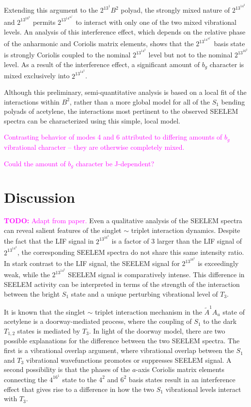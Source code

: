 \documentclass[12pt,draft]{mitthesis}
\newcommand{\TODO} [1]{\textcolor{magenta}{\textbf{TODO:} #1}}
\newcommand{\POINT}[1]{\textcolor{magenta}{#1}}
\begin{document}
Extending this argument to the $2^13^1B^2$ polyad, the strongly mixed
nature of $2^13^14^2$ and $2^13^16^2$ permits $2^13^14^16^1$ to
interact with only one of the two mixed vibrational levels. An
analysis of this interference effect, which depends on the relative
phase of the anharmonic and Coriolis matrix elements, shows that the
 $2^13^14^16^1$ basis state is strongly Coriolis coupled to the nominal
$2^13^14^2$ level but not to the nominal $2^13^16^2$ level. As a result
of the interference effect, a significant amount of $b_g$ character is
mixed exclusively into $2^13^14^2$.

Although this preliminary, semi-quantitative analysis is based on a
local fit of the interactions within $B^2$, rather than a more global
model for all of the $S_1$ bending polyads of acetylene, the interactions
most pertinent to the observed SEELEM spectra can be characterized
using this simple, local model.

\POINT{Contrasting behavior of modes 4 and 6 attributed to differing
  amounts of $b_g$ vibrational character -- they are otherwise
  completely mixed.}

\POINT{Could the amount of $b_g$ character be J-dependent?}

\section{Discussion}

\TODO{Adapt from paper.}  Even a qualitative analysis of the SEELEM
spectra can reveal salient features of the singlet $\sim$ triplet
interaction dynamics. Despite the fact that the LIF signal in
$2^13^16^2$ is a factor of 3 larger than the LIF signal of
$2^13^14^2$, the corresponding SEELEM spectra do not share this same
intensity ratio. In stark contrast to the LIF signal, the SEELEM
signal for $2^13^16^2$ is exceedingly weak, while the $2^13^14^2$
SEELEM signal is comparatively intense. This difference in SEELEM
activity can be interpreted in terms of the strength of the
interaction between the bright $S_1$ state and a unique perturbing
vibrational level of $T_3$.

It is known that the singlet $\sim$ triplet interaction mechanism in
the $\tilde{A}^1A_u$ state of acetylene is a doorway-mediated process,
where the coupling of $S_1$ to the dark $T_{1,2}$ states is mediated
by $T_3$.  In light of the doorway model, there are two possible
explanations for the difference between the two SEELEM spectra. The
first is a vibrational overlap argument, where vibrational overlap
between the $S_1$ and $T_3$ vibrational wavefunctions promotes or
suppresses SEELEM signal. A second possibility is that the phases of
the $a$-axis Coriolis matrix elements connecting the $4^16^1$ state to
the $4^2$ and $6^2$ basis states result in an interference effect that
gives rise to a difference in how the two $S_1$ vibrational levels
interact with $T_3$.
\end{document}
